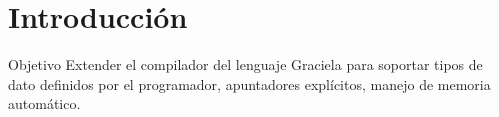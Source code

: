 \section*{Introducción}

\begin{frame}{Objetivo}
Extender el compilador del lenguaje Graciela 
para soportar tipos de dato definidos por el programador, apuntadores explícitos,
manejo de memoria automático.
\end{frame}
